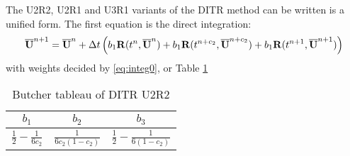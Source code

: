 \documentclass[preprint,12pt]{elsarticle}
\begin{document}
The U2R2, U2R1 and U3R1 variants of the
DITR method can be written is a unified form.
The first equation is the direct integration:
\begin{equation}
    \overline{\mathbf{U}}^{n+1} = \overline{\mathbf{U}}^{n} + \mathrm\Delta t\left(
    b_1 \mathbf{R}(t^n, \overline{\mathbf{U}}^n) +
    b_1 \mathbf{R}(t^{n+c_2}, \overline{\mathbf{U}}^{n+c_2}) +
    b_1 \mathbf{R}(t^{n+1}, \overline{\mathbf{U}}^{n+1})
    \right)
    \label{eq:DISum}
\end{equation}
with weights decided by \eqref{eq:integ0},
or Table \ref{tab:integ0Tab}
\begin{table}[htbp]
    \centering
    \begin{tabular}{|c|c|c|}
        \hline
        $b_1$                            & $b_2$ & $b_3$ \\
        \hline
        $\frac{1}{2} - \frac{1}{6{c_2}}$ &
        $\frac{1}{6{c_2}(1-{c_2})}$      &
        $\frac{1}{2} - \frac{1}{6(1-{c_2})} $            \\
        \hline
    \end{tabular}
    \caption{Butcher tableau of DITR U2R2}
    \label{tab:integ0Tab}
\end{table}
\end{document}
